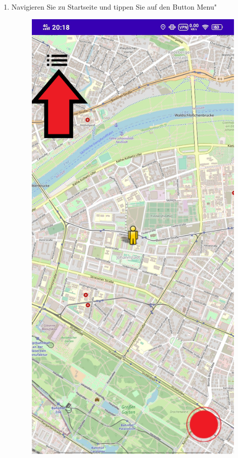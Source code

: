\documentclass{article}
\begin{document}
    \begin{enumerate}
        \item Navigieren Sie zu Startseite und tippen Sie auf den Button \glqq Menu"\\
        \begin{figure}[H]
            \includegraphics[scale=0.15]{1.png}

\end{figure}
\end{enumerate}
\end{document}
